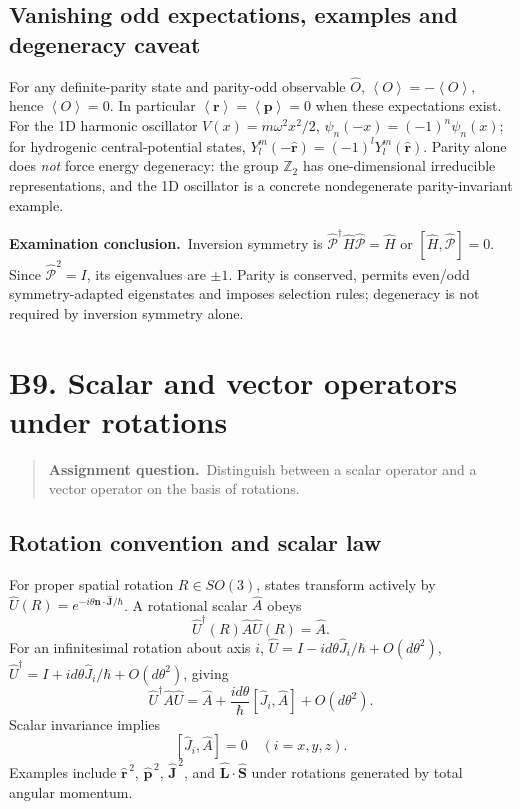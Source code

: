 \documentclass[11pt,a4paper]{article}
\theoremstyle{definition}
\newcommand{\avg}[1]{\left\langle #1\right\rangle}
\newcommand{\UU}{\hat U}
\newcommand{\PP}{\hat{\mathcal P}}
\newenvironment{question}{\begin{quote}\small\noindent\textbf{Assignment question.}\ }{\end{quote}}
\newcommand{\exam}[1]{\par\medskip\noindent\textbf{Examination conclusion.}\ #1\par}
\begin{document}
\subsection{Vanishing odd expectations, examples and degeneracy caveat}
For any definite-parity state and parity-odd observable \(\hat O\), \(\avg O=-\avg O\), hence \(\avg O=0\). In particular \(\avg{\mathbf r}=\avg{\mathbf p}=0\) when these expectations exist. For the 1D harmonic oscillator \(V(x)=m\omega^2x^2/2\), \(\psi_n(-x)=(-1)^n\psi_n(x)\); for hydrogenic central-potential states, \(Y_l^m(-\hat{\mathbf r})=(-1)^lY_l^m(\hat{\mathbf r})\). Parity alone does \emph{not} force energy degeneracy: the group \(\mathbb Z_2\) has one-dimensional irreducible representations, and the 1D oscillator is a concrete nondegenerate parity-invariant example.
\exam{Inversion symmetry is \(\PP^\dagger\hat H\PP=\hat H\) or \([\hat H,\PP]=0\). Since \(\PP^2=I\), its eigenvalues are \(\pm1\). Parity is conserved, permits even/odd symmetry-adapted eigenstates and imposes selection rules; degeneracy is not required by inversion symmetry alone.}

\section{B9. Scalar and vector operators under rotations}
\begin{question}Distinguish between a scalar operator and a vector operator on the basis of rotations.\end{question}
\subsection{Rotation convention and scalar law}
For proper spatial rotation \(R\in SO(3)\), states transform actively by \(\UU(R)=e^{-i\theta\mathbf n\cdot\hat{\mathbf J}/\hbar}\). A rotational scalar \(\hat A\) obeys
\begin{equation}
\boxed{\UU^\dagger(R)\hat A\UU(R)=\hat A.}
\end{equation}
For an infinitesimal rotation about axis \(i\), \(\UU=I-id\theta\hat J_i/\hbar+O(d\theta^2)\), \(\UU^\dagger=I+id\theta\hat J_i/\hbar+O(d\theta^2)\), giving
\begin{equation}
\UU^\dagger\hat A\UU=\hat A+\frac{id\theta}{\hbar}[\hat J_i,\hat A]+O(d\theta^2).
\end{equation}
Scalar invariance implies
\begin{equation}
\boxed{[\hat J_i,\hat A]=0\quad(i=x,y,z).}
\label{eq:scalar}
\end{equation}
Examples include \(\hat{\mathbf r}^{\,2}\), \(\hat{\mathbf p}^{\,2}\), \(\hat{\mathbf J}^{\,2}\), and \(\hat{\mathbf L}\cdot\hat{\mathbf S}\) under rotations generated by total angular momentum.
\end{document}
